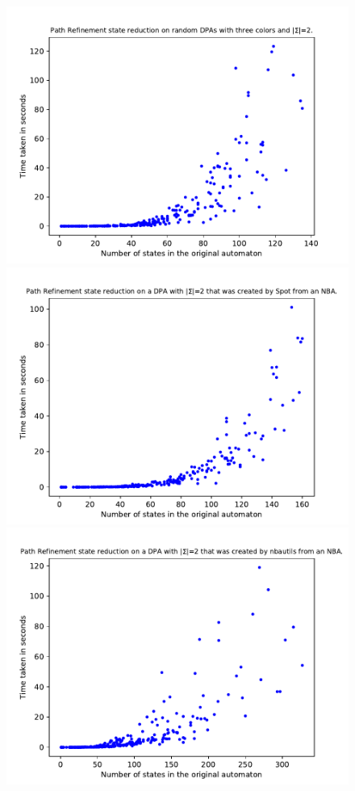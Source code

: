 \begin{figure}
	\centering
	\begin{minipage}{0.49\textwidth}
		\includegraphics[page=1,height=.3\textheight]{../data/analysis/path_refinement/gendet_ap1.pdf} 
		\includegraphics[page=1,height=.3\textheight]{../data/analysis/path_refinement/detspot_ap1.pdf} 
		\includegraphics[page=1,height=.3\textheight]{../data/analysis/path_refinement/detnbaut_ap1.pdf} 

\end{minipage}
\end{figure}
